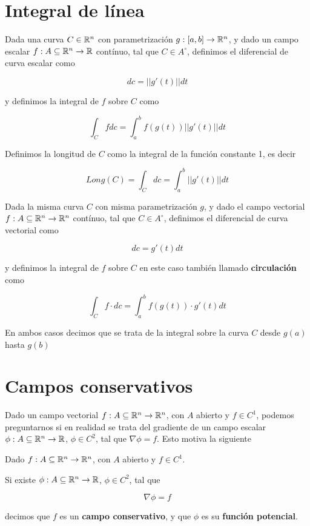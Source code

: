 \section{Integral de línea}

\begin{definition} 
Dada una curva $C \in \mathbb{R}^n$ con parametrización $ g:[a,b] \to \mathbb{R}^n$, y dado un campo escalar $f : A \subseteq \mathbb{R}^n \to \mathbb{R}$ contínuo, tal que $C \in A^{\circ}$, definimos el diferencial de curva escalar como

$$ dc = || g'(t) || dt $$

y definimos la integral de $f$ sobre $C$ como

$$ \int_C f dc = \int_a^b f(g(t)) || g'(t) || dt $$

Definimos la longitud de $C$ como la integral de la función constante 1, es decir

$$ Long(C) = \int_C dc = \int_a^b || g'(t) || dt $$

Dada la misma curva $C$ con misma parametrización $g$, y dado el campo vectorial $f : A \subseteq \mathbb{R}^n \to \mathbb{R}^n$ contínuo, tal que $C \in A^{\circ}$, definimos el diferencial de curva vectorial como

$$ dc = g'(t) dt $$

y definimos la integral de $f$ sobre $C$ en este caso también llamado \textbf{circulación} como

$$ \int_C f \cdot dc = \int_a^b f(g(t)) \cdot g'(t) dt$$

En ambos casos decimos que se trata de la integral sobre la curva $C$ desde $g(a)$ hasta $g(b)$
\end{definition}

\section{Campos conservativos}

Dado un campo vectorial $ f: A \subseteq \mathbb{R}^n \to \mathbb{R}^n$, con $A$ abierto y $f \in C^1$, podemos preguntarnos si en realidad se trata del gradiente de un campo escalar $\phi : A \subseteq \mathbb{R}^n \to \mathbb{R}$, $\phi \in C^2$, tal que $ \nabla \phi = f$.  Esto motiva la siguiente

\begin{definition}[Conservativo] 
Dado $ f: A \subseteq \mathbb{R}^n \to \mathbb{R}^n$, con $A$ abierto y $f \in C^1$.  

Si existe $\phi : A \subseteq \mathbb{R}^n \to \mathbb{R}$, $\phi \in C^2$, tal que 

$$ \nabla \phi = f$$

decimos que $f$ es un \textbf{campo conservativo}, y que $\phi$ es su \textbf{función potencial}. 
\end{definition}

